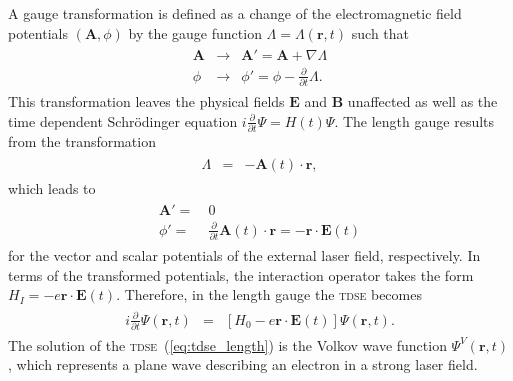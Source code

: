 A gauge transformation is defined as a change of the electromagnetic
field potentials $(\mathbf{A}, \phi)$ by the gauge function $\Lambda =
\Lambda(\mathbf{r},t)$ such that
%
\begin{eqnarray}
  \label{eq:gauge}
  \begin{split}
    \mathbf{A} & \to & \mathbf{A}' = \mathbf{A} + \nabla\Lambda \\
    \phi & \to & \phi' = \phi - \frac{\partial}{\partial t}\Lambda.
  \end{split}
\end{eqnarray}
%
This transformation leaves the physical fields $\mathbf{E}$ and
$\mathbf{B}$ unaffected as well as the time dependent Schr\"{o}dinger
equation $i\frac{\partial}{\partial t}\Psi = H(t)\Psi$. The length
gauge results from the transformation
%
\begin{eqnarray}
  \label{eq:length_gauge}
  \begin{split}
    \Lambda & = & -\mathbf{A}(t) \cdot \mathbf{r},
  \end{split}
\end{eqnarray}
%
which leads to
%
\begin{eqnarray}
  \label{eq:A_length}
  \begin{split}
    \mathbf{A}' = &\ 0 \\
    \phi' = &\ \frac{\partial}{\partial t}
    \mathbf{A}(t) \cdot \mathbf{r} = -\mathbf{r} \cdot \mathbf{E}(t) 
  \end{split}
\end{eqnarray}
for the vector and scalar potentials of the external laser field,
respectively. In terms of the transformed potentials, the interaction
operator takes the form $H_{I} = -e \mathbf{r} \cdot \mathbf{E}(t)$.
Therefore, in the length gauge the \textsc{tdse} becomes
%
\begin{eqnarray}
  \label{eq:tdse_length}
  \begin{split}
    i \frac{\partial}{\partial t} \Psi(\mathbf{r}, t) & = & \left[H_{0} -
      e\mathbf{r}\cdot\mathbf{E}(t) \right] \Psi(\mathbf{r}, t).
  \end{split}
\end{eqnarray}
%
The solution of the \textsc{tdse}~(\ref{eq:tdse_length}) is the Volkov
wave function $\Psi^{V}(\mathbf{r}, t)$, which represents a plane wave
describing an electron in a strong laser field.

